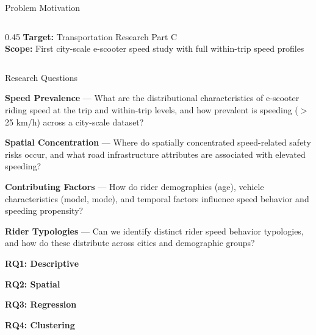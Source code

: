 \documentclass[aspectratio=169, 9pt]{beamer}
\newcommand{\hlbox}[2]{\colorbox{#1!12}{\strut\footnotesize\textcolor{#1!80!black}{\textbf{#2}}}}
\begin{document}
\begin{frame}{Problem Motivation}
\begin{columns}[T]
\begin{column}{0.45\textwidth}
  \vspace{10pt}
  \footnotesize
  \textbf{Target:} Transportation Research Part C\\
  \textbf{Scope:} First city-scale e-scooter speed study with full within-trip speed profiles
\end{column}
\end{columns}
\end{frame}

\begin{frame}{Research Questions}
\footnotesize
\begin{description}[\textbf{RQ4}]
  \item[\textcolor{boxindigo}{\textbf{RQ1}}] \textbf{Speed Prevalence} ---
    What are the distributional characteristics of e-scooter riding speed at the trip and within-trip levels, and how prevalent is speeding ($>$25 km/h) across a city-scale dataset?
    \vspace{4pt}

  \item[\textcolor{boxindigo}{\textbf{RQ2}}] \textbf{Spatial Concentration} ---
    Where do spatially concentrated speed-related safety risks occur, and what road infrastructure attributes are associated with elevated speeding?
    \vspace{4pt}

  \item[\textcolor{boxindigo}{\textbf{RQ3}}] \textbf{Contributing Factors} ---
    How do rider demographics (age), vehicle characteristics (model, mode), and temporal factors influence speed behavior and speeding propensity?
    \vspace{4pt}

  \item[\textcolor{boxindigo}{\textbf{RQ4}}] \textbf{Rider Typologies} ---
    Can we identify distinct rider speed behavior typologies, and how do these distribute across cities and demographic groups?
\end{description}

\vspace{8pt}
\centering
\hlbox{boxindigo}{RQ1: Descriptive} \quad
\hlbox{boxgreen}{RQ2: Spatial} \quad
\hlbox{boxorange}{RQ3: Regression} \quad
\hlbox{boxpurple}{RQ4: Clustering}
\end{frame}
\end{document}
